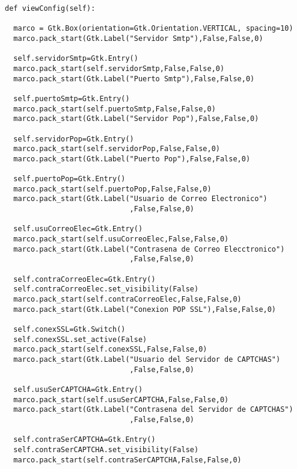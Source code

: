 \begin{lstlisting}[frame=single]
 def viewConfig(self):
 
  marco = Gtk.Box(orientation=Gtk.Orientation.VERTICAL, spacing=10)
  marco.pack_start(Gtk.Label("Servidor Smtp"),False,False,0)
  
  self.servidorSmtp=Gtk.Entry()
  marco.pack_start(self.servidorSmtp,False,False,0)
  marco.pack_start(Gtk.Label("Puerto Smtp"),False,False,0)
  
  self.puertoSmtp=Gtk.Entry()
  marco.pack_start(self.puertoSmtp,False,False,0)
  marco.pack_start(Gtk.Label("Servidor Pop"),False,False,0)
  
  self.servidorPop=Gtk.Entry()
  marco.pack_start(self.servidorPop,False,False,0)
  marco.pack_start(Gtk.Label("Puerto Pop"),False,False,0)
  
  self.puertoPop=Gtk.Entry()
  marco.pack_start(self.puertoPop,False,False,0)
  marco.pack_start(Gtk.Label("Usuario de Correo Electronico")
                             ,False,False,0)
                             
  self.usuCorreoElec=Gtk.Entry()
  marco.pack_start(self.usuCorreoElec,False,False,0)
  marco.pack_start(Gtk.Label("Contrasena de Correo Elecctronico")
                             ,False,False,0)
                             
  self.contraCorreoElec=Gtk.Entry()
  self.contraCorreoElec.set_visibility(False)
  marco.pack_start(self.contraCorreoElec,False,False,0)
  marco.pack_start(Gtk.Label("Conexion POP SSL"),False,False,0)
  
  self.conexSSL=Gtk.Switch()
  self.conexSSL.set_active(False)
  marco.pack_start(self.conexSSL,False,False,0)
  marco.pack_start(Gtk.Label("Usuario del Servidor de CAPTCHAS")
                             ,False,False,0)
                             
  self.usuSerCAPTCHA=Gtk.Entry()
  marco.pack_start(self.usuSerCAPTCHA,False,False,0)
  marco.pack_start(Gtk.Label("Contrasena del Servidor de CAPTCHAS")
                             ,False,False,0)
                             
  self.contraSerCAPTCHA=Gtk.Entry()
  self.contraSerCAPTCHA.set_visibility(False)
  marco.pack_start(self.contraSerCAPTCHA,False,False,0)
\end{lstlisting}
